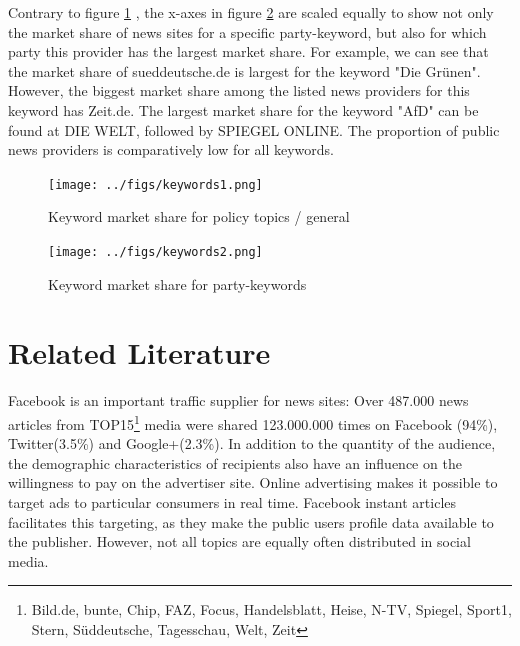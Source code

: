 \documentclass[12pt,a4paper,notitlepage]{article}
\begin{document}
Contrary to figure \ref{fig_keywords1} , the x-axes in figure \ref{fig_keywords2} are scaled equally to show not only the market share of news sites for a specific party-keyword, but also for which party this provider has the largest market share. For example, we can see that the market share of sueddeutsche.de is largest for the keyword "Die Grünen". However, the biggest market share among the listed news providers for this keyword has Zeit.de. The largest market share for the keyword "AfD" can be found at DIE WELT, followed by SPIEGEL ONLINE. The proportion of public news providers is comparatively low for all keywords. 

\begin{figure}[H]
	\begin{center}
			\texttt{[image: ../figs/keywords1.png]}
			\caption{Keyword market share for policy topics / general}
			\label{fig_keywords1}
	\end{center}
\end{figure}

\begin{figure}[H]
	\begin{center}
			\texttt{[image: ../figs/keywords2.png]}
			\caption{Keyword market share for party-keywords}
			\label{fig_keywords2}
	\end{center}
\end{figure}


\section{Related Literature}


Facebook is an important traffic supplier for news sites: Over 487.000 news articles from TOP15\footnote{Bild.de, bunte, Chip, FAZ, Focus, Handelsblatt, Heise, N-TV, Spiegel, Sport1, Stern, Süddeutsche, Tagesschau, Welt, Zeit} media were shared 123.000.000 times on Facebook (94\%), Twitter(3.5\%) and Google+(2.3\%).\cite{schiller_development_2016} In addition to the quantity of the audience, the demographic characteristics of recipients also have an influence on the willingness to pay on the advertiser site. Online advertising makes it possible to target ads to particular consumers in real time. Facebook instant articles facilitates this targeting, as they make the public users profile data available to the publisher. However, not all topics are equally often distributed in social media.
\end{document}
